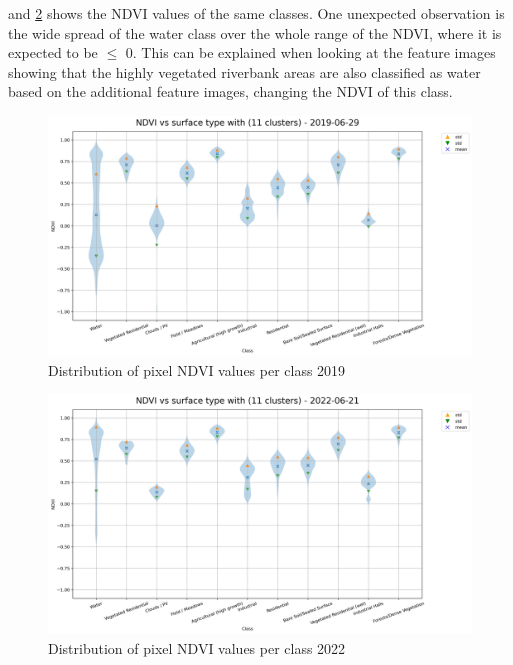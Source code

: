 \documentclass[12pt,a4paper, english,twoside]{scrartcl}
\begin{document}
        and \cref{fig:ndviclusters2022} shows the NDVI values of the same classes.
       One unexpected observation is the wide spread of the water class over the whole range of the NDVI, where it is expected to be $\le$ 0. 
       This can be explained when looking at the feature images showing that the highly vegetated riverbank areas are also classified as water based on the additional feature images, changing the NDVI of this class.
       \begin{landscape}
         \begin{figure}[!p]
           \centering
           \includegraphics[width=0.91\linewidth]{img/NDVI vs surface type with (11 clusters) - 2019-06-29.png}
           \caption{Distribution of pixel \gls{NDVI} values per class 2019\label{fig:ndviclusters2019}}
         \end{figure}

         \begin{figure}[!p]
           \centering
           \includegraphics[width=0.91\linewidth]{img/NDVI vs surface type with (11 clusters) - 2022-06-21.png}
           \caption{Distribution of pixel \gls{NDVI} values per class 2022\label{fig:ndviclusters2022}}
         \end{figure}
       \end{landscape}
\end{document}
